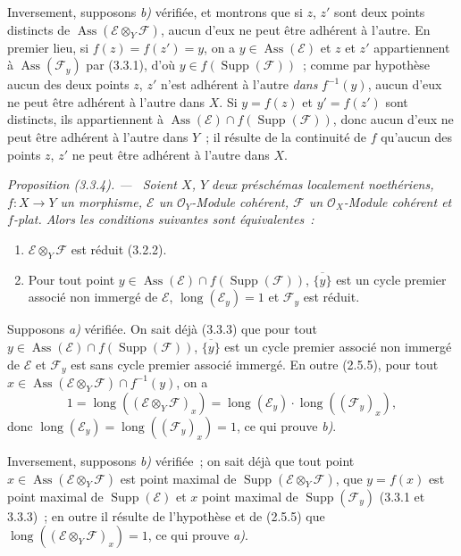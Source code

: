 \documentclass[10pt,oneside]{book}
\newenvironment{proposition}[1][]{%
  \par\medskip\noindent\itshape Proposition (#1). ---\ }{\par}
\begin{document}
Inversement, supposons \emph{b)} vérifiée, et montrons que si $z$, $z'$ sont
deux points distincts de $\operatorname{Ass}(\mathcal E\otimes_Y\mathcal F)$,
aucun d'eux ne peut être adhérent à l'autre. En premier lieu, si
$f(z)=f(z')=y$, on a $y\in\operatorname{Ass}(\mathcal E)$ et $z$ et $z'$
appartiennent à $\operatorname{Ass}(\mathcal F_y)$ par (3.3.1), d'où
$y\in f(\operatorname{Supp}(\mathcal F))$~; comme par hypothèse aucun des deux
points $z$, $z'$ n'est adhérent à l'autre \emph{dans} $f^{-1}(y)$, aucun d'eux
ne peut être adhérent à l'autre dans $X$. Si $y=f(z)$ et $y'=f(z')$ sont
distincts, ils appartiennent à
$\operatorname{Ass}(\mathcal E)\cap f(\operatorname{Supp}(\mathcal F))$, donc
aucun d'eux ne peut être adhérent à l'autre dans $Y$~; il résulte de la
continuité de $f$ qu'aucun des points $z$, $z'$ ne peut être adhérent à
l'autre dans $X$.

\begin{proposition}[3.3.4]
\label{IV.2.3.3.4-fr}
Soient $X$, $Y$ deux préschémas localement noethériens, $f:X\to Y$ un
morphisme, $\mathcal E$ un $\mathcal O_Y$-Module cohérent, $\mathcal F$ un
$\mathcal O_X$-Module cohérent et $f$-plat. Alors les conditions suivantes
sont équivalentes~:
\begin{enumerate}
\item[\emph{a)}] $\mathcal E\otimes_Y\mathcal F$ est réduit (3.2.2).
\item[\emph{b)}] Pour tout point
$y\in\operatorname{Ass}(\mathcal E)\cap f(\operatorname{Supp}(\mathcal F))$,
$\overline{\{y\}}$ est un cycle premier associé non immergé de $\mathcal E$,
$\operatorname{long}(\mathcal E_y)=1$ et $\mathcal F_y$ est réduit.
\end{enumerate}
\end{proposition}

Supposons \emph{a)} vérifiée. On sait déjà (3.3.3) que pour tout
$y\in\operatorname{Ass}(\mathcal E)\cap f(\operatorname{Supp}(\mathcal F))$,
$\overline{\{y\}}$ est un cycle premier associé non immergé de $\mathcal E$ et
$\mathcal F_y$ est sans cycle premier associé immergé. En outre (2.5.5), pour
tout $x\in\operatorname{Ass}(\mathcal E\otimes_Y\mathcal F)\cap f^{-1}(y)$,
on a
\[
1=\operatorname{long}((\mathcal E\otimes_Y\mathcal F)_x)
=\operatorname{long}(\mathcal E_y)\cdot\operatorname{long}((\mathcal F_y)_x),
\]
donc $\operatorname{long}(\mathcal E_y)
=\operatorname{long}((\mathcal F_y)_x)=1$, ce qui prouve \emph{b)}.

Inversement, supposons \emph{b)} vérifiée~; on sait déjà que tout point
$x\in\operatorname{Ass}(\mathcal E\otimes_Y\mathcal F)$ est point maximal de
$\operatorname{Supp}(\mathcal E\otimes_Y\mathcal F)$, que $y=f(x)$ est point
maximal de $\operatorname{Supp}(\mathcal E)$ et $x$ point maximal de
$\operatorname{Supp}(\mathcal F_y)$ (3.3.1 et 3.3.3)~; en outre il résulte de
l'hypothèse et de (2.5.5) que
$\operatorname{long}((\mathcal E\otimes_Y\mathcal F)_x)=1$, ce qui prouve
\emph{a)}.
\end{document}
